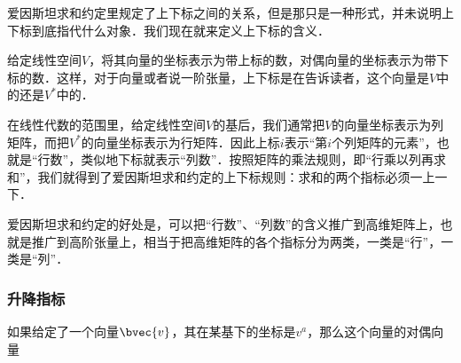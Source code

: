 爱因斯坦求和约定里规定了上下标之间的关系，但是那只是一种形式，并未说明上下标到底指代什么对象．我们现在就来定义上下标的含义．

\begin{definition}{}
给定线性空间$V$，将其向量的坐标表示为带上标的数，对偶向量的坐标表示为带下标的数．这样，对于向量或者说一阶张量，上下标是在告诉读者，这个向量是$V$中的还是$V^*$中的．
\end{definition}

在线性代数的范围里，给定线性空间$V$的基后，我们通常把$V$的向量坐标表示为列矩阵，而把$V^*$的向量坐标表示为行矩阵．因此上标$i$表示“第$i$个列矩阵的元素”，也就是“行数”，类似地下标就表示“列数”．按照矩阵的乘法规则，即“行乘以列再求和”，我们就得到了爱因斯坦求和约定的上下标规则：求和的两个指标必须一上一下．

爱因斯坦求和约定的好处是，可以把“行数”、“列数”的含义推广到高维矩阵上，也就是推广到高阶张量上，相当于把高维矩阵的各个指标分为两类，一类是“行”，一类是“列”．

\subsubsection{升降指标}

如果给定了一个向量$\bvec{v}$，其在某基下的坐标是$v^a$，那么这个向量的对偶向量
















